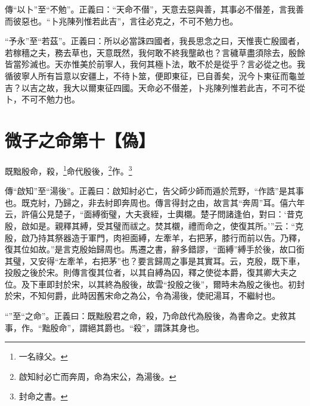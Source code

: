{\noindent\zhuan{}\fzbyks 傳“以卜”至“不勉”。正義曰：“天命不僣”，天意去惡與善，其事必不僣差，言我善而彼惡也。“卜兆陳列惟若此吉”，言往必克之，不可不勉力也。 \par}

{\noindent\shu{}\fzkt “予永”至“若茲”。正義曰：所以必當誅四國者，我長思念之曰，天惟喪亡殷國者，若稼穡之夫，務去草也，天意既然，我何敢不終我壟畝也？言穢草盡須除去，殷餘皆當殄滅也。天亦惟美於前寧人，我何其極卜法，敢不於是從乎？言必從之也。我循彼寧人所有旨意以安疆上，不待卜筮，便即東征，已自善矣，況今卜東征而龜並吉？以吉之故，我大以爾東征四國。天命必不僣差，卜兆陳列惟若此吉，不可不從卜，不可不勉力也。 \par}

\section{微子之命第十【偽】}


既黜殷命，殺，\footnote{一名祿父。}命代殷後，\footnote{啟知紂必亡而奔周，命為宋公，為湯後。}作。\footnote{封命之書。}


{\noindent\zhuan{}\fzbyks 傳“啟知”至“湯後”。正義曰：啟知紂必亡，告父師少師而遁於荒野，“作誥”是其事也。既克紂，乃歸之，非去紂即奔周也。傳言得封之由，故言其“奔周”耳。僖六年云，許僖公見楚子，“面縛銜璧，大夫衰絰，士輿櫬。楚子問諸逢伯，對曰：‘昔克殷，啟如是。親釋其縛，受其璧而祓之。焚其櫬，禮而命之，使復其所。’”云：“克殷，啟乃持其祭器造于軍門，肉袒面縛，左牽羊，右把茅，膝行而前以告。乃釋，復其位如故。”是言克殷始歸周也。馬遷之書，辭多錯謬，“面縛”縛手於後，故口銜其璧，又安得“左牽羊，右把茅”也？要言歸周之事是其實耳。云，克殷，既下車，投殷之後於宋。則傳言復其位者，以其自縛為囚，釋之使從本爵，復其卿大夫之位。及下車即封於宋，以其終為殷後，故雲“投殷之後”，爾時未為殷之後也。初封於宋，不知何爵，此時因舊宋命之為公，令為湯後，使祀湯耳，不繼紂也。 \par}

{\noindent\shu{}\fzkt “”至“之命”。正義曰：既黜殷君之命，殺，乃命啟代為殷後，為書命之。史敘其事，作。“黜殷命”，謂絕其爵也。“殺”，謂誅其身也。 \par}

